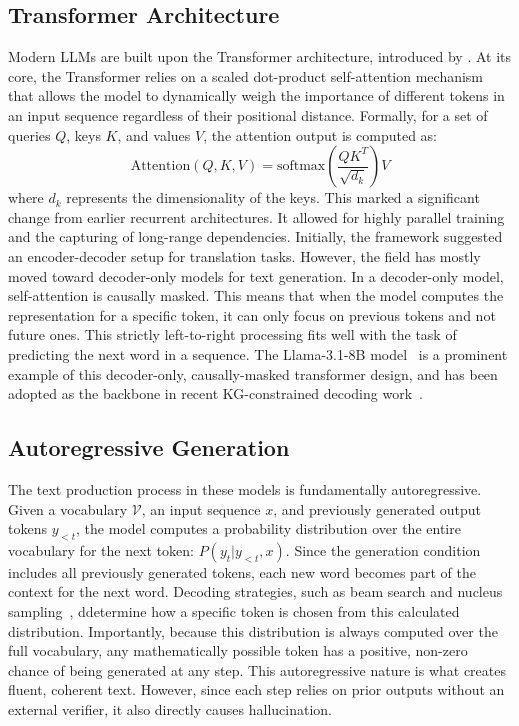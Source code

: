 \subsection{Transformer Architecture}

Modern LLMs are built upon the Transformer architecture, introduced by \citet{vaswani2017attention}. At its core, the Transformer relies on a scaled dot-product self-attention mechanism that allows the model to dynamically weigh the importance of different tokens in an input sequence regardless of their positional distance. Formally, for a set of queries $Q$, keys $K$, and values $V$, the attention output is computed as:
\begin{equation}
  \text{Attention}(Q, K, V) = \text{softmax}\left(\frac{QK^T}{\sqrt{d_k}}\right)V
\end{equation}
where $d_k$ represents the dimensionality of the keys. This marked a significant change from earlier recurrent architectures. It allowed for highly parallel training and the capturing of long-range dependencies. Initially, the framework suggested an encoder-decoder setup for translation tasks. However, the field has mostly moved toward decoder-only models for text generation. In a decoder-only model, self-attention is causally masked. This means that when the model computes the representation for a specific token, it can only focus on previous tokens and not future ones. This strictly left-to-right processing fits well with the task of predicting the next word in a sequence. The Llama-3.1-8B model~\citep{dubey2024llama3} is a prominent example of this decoder-only, causally-masked transformer design, and has been adopted as the backbone in recent KG-constrained decoding work~\citep{luo2025-graph-constrained-reasoning}.

\subsection{Autoregressive Generation}

The text production process in these models is fundamentally autoregressive. Given a vocabulary $\mathcal{V}$, an input sequence $x$, and previously generated output tokens $y_{<t}$, the model computes a probability distribution over the entire vocabulary for the next token: $P(y_t | y_{<t}, x)$. Since the generation condition includes all previously generated tokens, each new word becomes part of the context for the next word. Decoding strategies, such as beam search and nucleus sampling~\citep{holtzman2020curious}, ddetermine how a specific token is chosen from this calculated distribution. Importantly, because this distribution is always computed over the full vocabulary, any mathematically possible token has a positive, non-zero chance of being generated at any step. This autoregressive nature is what creates fluent, coherent text. However, since each step relies on prior outputs without an external verifier, it also directly causes hallucination.



